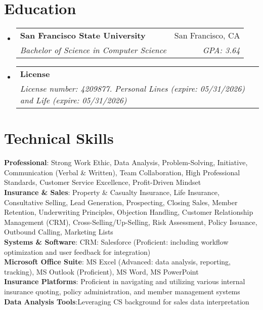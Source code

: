 \documentclass[letterpaper,10pt]{article}
\makeatletter
\newcommand{\resumeSubheading}[4]{
  \vspace{-2pt}\item %
  \begin{tabular*}{0.97\textwidth}[t]{l@{\extracolsep{\fill}}r}
    \textbf{#1} & #2 \\
    \textit{\small#3} & \textit{\small #4} \\
  \end{tabular*}\vspace{-6pt} %
}
\newcommand{\resumeSubHeadingListStart}{\begin{itemize}[leftmargin=0.15in, label={}]}
\newcommand{\resumeSubHeadingListEnd}{\end{itemize}}
\makeatother
\begin{document}
\section{Education}
\resumeSubHeadingListStart
    \resumeSubheading
      {San Francisco State University}{San Francisco, CA}
      {Bachelor of Science in Computer Science}{GPA: 3.64} %
    \vspace{1pt} %
    \resumeSubheading %
      {License}{} %
      {License number: 4209877. Personal Lines (expire: 05/31/2026) and Life (expire: 05/31/2026)}{} %
\resumeSubHeadingListEnd

\section{Technical Skills}
\begin{itemize}[leftmargin=0.15in, label={}] %
    \small{\item{ %
        \textbf{Professional}{: Strong Work Ethic, Data Analysis, Problem-Solving, Initiative, Communication (Verbal \& Written), Team Collaboration, High Professional Standards, Customer Service Excellence, Profit-Driven Mindset}\\
        \textbf{Insurance \& Sales}{: Property \& Casualty Insurance, Life Insurance, Consultative Selling, Lead Generation, Prospecting, Closing Sales, Member Retention, Underwriting Principles, Objection Handling, Customer Relationship Management (CRM), Cross-Selling/Up-Selling, Risk Assessment, Policy Issuance, Outbound Calling, Marketing Lists}\\
        \textbf{Systems \& Software}{: CRM: Salesforce (Proficient: including workflow optimization and user feedback for integration)} \\
        \textbf{Microsoft Office Suite}{: MS Excel (Advanced: data analysis, reporting, tracking), MS Outlook (Proficient), MS Word, MS PowerPoint} \\
        \textbf{Insurance Platforms}{:  Proficient in navigating and utilizing various internal insurance quoting, policy administration, and member management systems} \\
        \textbf{Data Analysis Tools}{:Leveraging CS background for sales data interpretation} \\
    }}
\end{itemize}
\end{document}

